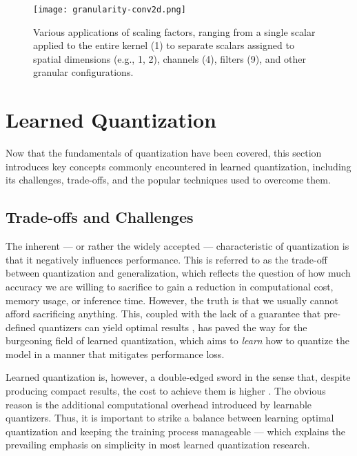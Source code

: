 \begin{figure}[t!]
  \centering
  \texttt{[image: granularity-conv2d.png]}
  \caption{Various applications of scaling factors, ranging from a single scalar applied to the entire kernel (1) to separate scalars assigned to spatial dimensions (e.g., 1, 2), channels (4), filters (9), and other granular configurations.}
  \label{fig:granularity-conv2d}
\end{figure}



\section{Learned Quantization}
\label{sec:learnedquantization}
\hspace*{1em}Now that the fundamentals of quantization have been covered, 
this section introduces key concepts commonly encountered in learned quantization,
including its challenges, trade-offs, and the popular techniques used to overcome them.



\subsection{Trade-offs and Challenges}
\label{subsec:subsection1}
\hspace*{1em}The inherent — or rather the widely accepted — characteristic of quantization is
that it negatively influences performance. 
This is referred to as the trade-off between quantization and generalization, 
which reflects the question of how much accuracy we are willing to sacrifice to gain a reduction in computational cost, memory usage, or inference time.
However, the truth is that we usually cannot afford sacrificing anything.  This, coupled with the lack of a guarantee
 that pre-defined quantizers can yield optimal results \cite{DBLP:conf/eccv/ZhangYYH18} \cite{DBLP:conf/iclr/EsserMBAM20}, 
 has paved the way for the burgeoning field of learned quantization,
 which aims to \textit{learn} how to quantize the model in a manner that mitigates performance loss.

Learned quantization is, however, a double-edged sword in the sense that, despite producing compact results,
the cost to achieve them is higher \cite{DBLP:conf/eccv/ParkYV18}. The obvious reason is the additional computational overhead
introduced by learnable quantizers.
Thus, it is important to strike a balance between learning optimal quantization and keeping the training process manageable
— which explains the prevailing emphasis on simplicity in most learned quantization research.

